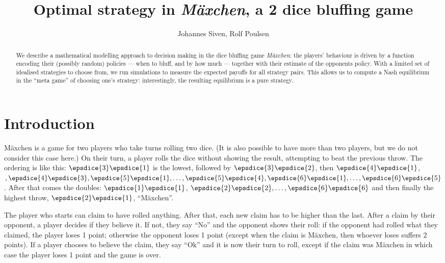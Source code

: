 \documentclass[12pt]{article}
\begin{document}
\title{\Large{Optimal strategy in \emph{M\"{a}xchen}, a 2 dice bluffing game}}
\author{Johannes Siven, Rolf Poulsen}
\maketitle
\begin{abstract}We describe a mathematical modelling approach to decision making in the dice bluffing game \emph{M\"{a}xchen}: the players' behaviour is driven by a function encoding their (possibly random) policies --- when to bluff, and by how much --- together with their estimate of the opponents policy. With a limited set of idealised strategies to choose from, we run simulations to measure the expected payoffs for all strategy pairs. This allows us to compute a Nash equilibrium in the ``meta game'' of choosing one's strategy: interestingly, the resulting equilibrium is a pure strategy.
\end{abstract}
\section{\large{Introduction}}
M\"{a}xchen is a game for two players who take turns rolling two dice. (It is also possible to have more than two players, but we do not consider this case here.) On their turn, a player rolls the dice without showing the result, attempting to beat the previous throw. The ordering is like this: $\epsdice{3}\epsdice{1}$ is the lowest, followed by $\epsdice{3}\epsdice{2}$, then $\epsdice{4}\epsdice{1}$, $, \epsdice{4}\epsdice{3}, \epsdice{5}\epsdice{1}, \ldots, \epsdice{5}\epsdice{4},\epsdice{6}\epsdice{1},\ldots,\epsdice{6}\epsdice{5}$. After that comes the doubles: $\epsdice{1}\epsdice{1}$, $\epsdice{2}\epsdice{2},\ldots,\epsdice{6}\epsdice{6}$ and then finally the highest throw, $\epsdice{2}\epsdice{1}$, ``M\"{a}xchen''. 

The player who starts can claim to have rolled anything. After that, each new claim has to be higher than the last. After a claim by their opponent, a player decides if they believe it. If not, they say ``No'' and the opponent shows their roll: if the opponent had rolled what they claimed, the player loses 1 point; otherwise the opponent loses 1 point (except when the claim is M\"{a}xchen, then whoever loses suffers 2 points). If a player chooses to believe the claim, they say ``Ok'' and it is now their turn to roll, except if the claim was M\"{a}xchen in which case the player loses 1 point and the game is over.
\end{document}
